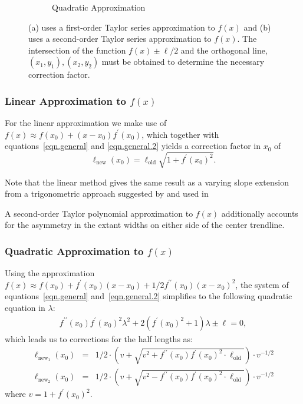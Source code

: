 \documentclass[11pt]{isuthesis}\usepackage[]{graphicx}\usepackage[]{color}
\begin{document}
\begin{figure}[h!]
\begin{subfigure}[t]{0.4\textwidth}
\caption{Quadratic Approximation}\label{fig:quadratic-GeneralCorrection}
\end{subfigure}
\caption[Methods based on Approximations to f(x)]{(a) uses a first-order Taylor series approximation to $f(x)$ and (b) uses a second-order Taylor series approximation to $f(x)$. The intersection of the function $f(x) \pm \ell/2$ and the orthogonal line,  $(x_1, y_1), (x_2, y_2)$ must be obtained to determine the necessary correction factor.}\label{fig:linear.quadratic} 
\end{figure}

\subsubsection{Linear Approximation to $f(x)$}\hfill\newline
For the linear approximation we make use of $f(x) \approx f(x_0) + (x - x_0) f^\prime(x_0)$, which together with  equations~\ref{eqn.general} and \ref{eqn.general.2} yields a correction factor in $x_0$ of
\[
\ell_{\text{new}}(x_0) = \ell_{\text{old}} \sqrt{1 +  f^\prime(x_0)^2}.
\]

Note that the linear method gives the same result as a varying slope extension from a trigonometric approach  suggested by \citet{schonlau:2003} and used in \citet{marie:2013}

A second-order Taylor polynomial approximation to $f(x)$ additionally accounts for the asymmetry in the extant widths on either side of the center trendline.

\subsubsection{Quadratic Approximation to $f(x)$}\hfill\newline
Using the approximation $f(x) \approx f(x_0) + f^\prime(x_0)(x-x_0) + 1/2 f^{\prime\prime}(x_0)(x-x_0)^2$, the system of equations~\ref{eqn.general} and~\ref{eqn.general.2}  simplifies to the following  quadratic equation in $\lambda$:
\begin{eqnarray*}
f^{\prime\prime}(x_0)  f^\prime(x_0)^2 \lambda^2  + 2(f^\prime(x_0)^2 + 1) \lambda  \pm \ell = 0,
\end{eqnarray*}
which leads us to corrections for the half lengths as:
\begin{eqnarray}\label{eqn.q1}
\ell_{\text{new}_1}(x_0) &=& 1 /2 \cdot  \left(v + \sqrt{ v^2 +  f^{\prime\prime}(x_0) f^\prime(x_0)^2\cdot  \ell_{\text{old}}}\right) \cdot v^{-1/2} \\\label{eqn.q2}
\ell_{\text{new}_2}(x_0) &=& 1 /2 \cdot  \left(v + \sqrt{ v^2 -  f^{\prime\prime}(x_0) f^\prime(x_0)^2\cdot  \ell_{\text{old}}}\right) \cdot v^{-1/2} 
\end{eqnarray}
where $v = 1 + f^\prime(x_0)^2$.
\end{document}
